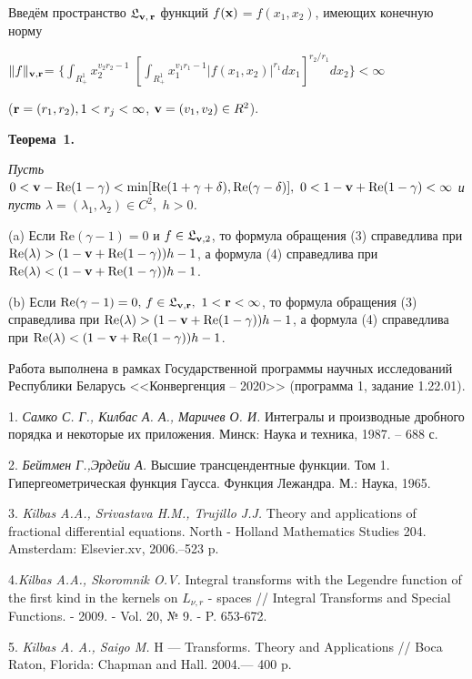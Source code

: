 Введём пространство  $\mathfrak{L}_{{\bf v},\,{\bf r}}$ функций
$f({\bf{x}})$$=f(x_{1},x_{2})$, имеющих конечную норму

\noindent$ \|f\|_{\bf{v},\bf{r}}$=
 $ \{\int_{R_{+}^{1}}x_{2}^{v_{2}r_{2}-1}$
$[\int_{R_{+}^{1}}x_{1}^{v_{1}r_{1}-1}
|f(x_{1},x_{2})|^{r_{1}}dx_{1}]^{r_{2}/r_{1}}dx_{2}\} <\infty$

 \noindent(${\bf r}=(r_{1},r_{2}), 1<{ r_{j}}<\infty$,
 ${\bf v}=(v_{1},v_{2})\in { R}^{2}$).


 \textbf{Теорема~1.} {\it Пусть
$0<{\bf
v}-\mathrm{Re}(1-\gamma)<\min[\mathrm{Re}(1+\gamma+\delta),\mathrm{Re}(\gamma-\delta)],\,\,
0<1-{\bf v}+\mathrm{Re}(1-\gamma)<\infty$ и пусть $\lambda =
(\lambda_{1},\lambda_{2})\in C^{2},\,\,h>0$.

(a) Если $\mathrm{Re}(\gamma-1)=0$ и $f\in\mathfrak{L}_{{\bf v},2}$,
то формула обращения (3)  справедлива  при
$\mathrm{Re}(\lambda)>(1-{\bf v}+\mathrm{Re}(1-\gamma))h-1$, а
формула (4) справедлива при $\mathrm{Re}(\lambda)<(1-{\bf
v}+\mathrm{Re}(1-\gamma))h-1$.

(b) Если $\mathrm{Re}(\gamma-1)=0,\,f\in\mathfrak{L}_{{\bf v},{\bf
r}},\,\,1<{\bf r}<\infty$, то формула обращения  (3) справедлива при
$\mathrm{Re}(\lambda)>(1-{\bf v}+\mathrm{Re}(1-\gamma))h-1$, а
формула (4) справедлива при $\mathrm{Re}(\lambda)<(1-{\bf
v}+\mathrm{Re}(1-\gamma))h-1$.}

Работа выполнена в рамках Государственной программы научных
исследований Республики Беларусь <<Конвергенция -- 2020>> (программа
1, задание 1.22.01).

\litlist


1. {\it Самко С. Г., Килбас А. А., Маричев О. И.} Интегралы и
производные дробного порядка и некоторые их приложения. Минск: Наука
и техника, 1987. -- 688 с.

2. {\it  Бейтмен Г.,Эрдейи А.}  Высшие трансцендентные функции. Том
1. Гипергеометрическая функция Гаусса. Функция Лежандра. М.: Наука,
1965.

3. {\it Kilbas A.A., Srivastava H.M., Trujillo J.J.} Theory and
applications of fractional differential equations. North - Holland
Mathematics Studies 204. Amsterdam: Elsevier.xv, 2006.--523 p.

4.{\it Kilbas A.A., Skoromnik O.V.} Integral transforms with the
Legendre function of the first kind in the kernels on $L_{\nu,r}$ -
spaces // Integral Transforms and Special Functions. - 2009. - Vol.
20, № 9. - P. 653-672.

5. {\it  Kilbas A. A., Saigo M.} H — Transforms. Theory and
Applications // Boca Raton, Florida: Chapman and Hall. 2004.— 400 p.


